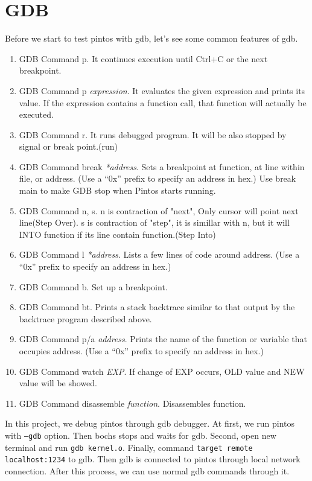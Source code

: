 \documentclass[a4paper,article,11pt,oneside]{article}
\begin{document}
\section{GDB}\label{secgdb}
Before we start to test pintos with gdb, let's see some common features of gdb.
\begin{enumerate}
\item GDB Command p.
It continues execution until Ctrl+C or the next breakpoint.
\item GDB Command p \textit{expression}.
It evaluates the given expression and prints its value. If the expression contains a function call, that function will actually be executed.
\item GDB Command r.
It runs debugged program. It will be also stopped by signal or break point.(run)
\item GDB Command break \textit{*address}.
Sets a breakpoint at function, at line within file, or address. (Use a “0x” prefix to specify an address in hex.)
Use break main to make GDB stop when Pintos starts running.
\item GDB Command n, s.
n is contraction of "next", Only cursor will point next line(Step Over). s is contraction of "step", it is simillar with n, but it will INTO function if its line contain function.(Step Into)
\item GDB Command l \textit{*address}.
Lists a few lines of code around address. (Use a “0x” prefix to specify an address in hex.)
\item GDB Command b.
Set up a breakpoint.
\item GDB Command bt.
Prints a stack backtrace similar to that output by the backtrace program described above.
\item GDB Command p/a \textit{address}.
Prints the name of the function or variable that occupies address. (Use a “0x” prefix to specify an address in hex.)
\item GDB Command watch \textit{EXP}.
If change of EXP occurs, OLD value and NEW value will be showed.
\item GDB Command disassemble \textit{function}.
Disassembles function. 
\end{enumerate}

In this project, we debug pintos through gdb debugger. At first, we run pintos with \texttt{--gdb} option. Then bochs stops and waits for gdb. Second, open new terminal and run \texttt{gdb kernel.o}.  Finally, command \texttt{target remote localhost:1234} to gdb. Then gdb is connected to pintos through local network connection. After this process, we can use normal gdb commands through it.
\end{document}
